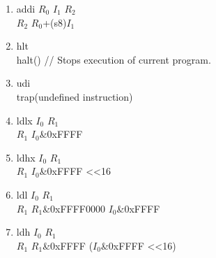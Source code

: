 \documentclass{article}
\begin{document}
\begin{enumerate}
		\item addi $R_0$ $I_1$ $R_2$\\
			$R_2$ \textleftarrow \space $R_0$+(s8)$I_1$
		\item hlt\\
			halt() // Stops execution of current program.
		\item udi\\
			trap(undefined instruction)
		\item ldlx $I_0$ $R_1$\\
			$R_1$ \textleftarrow \space $I_0$\&0xFFFF
		\item ldhx $I_0$ $R_1$\\
			$R_1$ \textleftarrow \space $I_0$\&0xFFFF \textless\textless 16
		\item ldl $I_0$ $R_1$\\
			$R_1$ \textleftarrow \space $R_1$\&0xFFFF0000 \textbar \space $I_0$\&0xFFFF
		\item ldh $I_0$ $R_1$\\
			$R_1$ \textleftarrow \space $R_1$\&0xFFFF \textbar \space ($I_0$\&0xFFFF \textless\textless 16)
	\end{enumerate}
\end{document}
